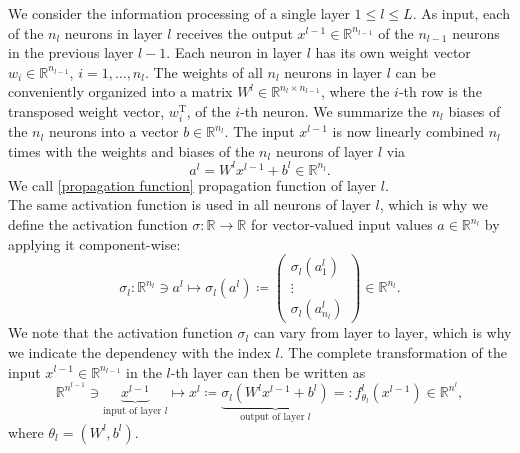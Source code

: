 We consider the information processing of a single layer $1 \leq l \leq L$. As input, each of the $n_l$ neurons in layer $l$ receives the output $x^{l-1} \in \mathbb{R}^{n_{l-1}}$ of the $n_{l-1}$ neurons in the previous layer $l-1$. Each neuron in layer $l$ has its own weight vector $w_i \in \mathbb{R}^{n_{l-1}}$, $i = 1, \ldots, n_l$. The weights of all $n_l$ neurons in layer $l$ can be conveniently organized into a matrix $W^l \in \mathbb{R}^{n_l \times n_{l-1}}$, where the $i$-th row is the transposed weight vector, $w^{\mathrm{T}}_i$, of the $i$-th neuron. We summarize the $n_l$ biases of the $n_l$ neurons into a vector $b \in \mathbb{R}^{n_l}$. The input $x^{l-1}$ is now linearly combined $n_l$ times with the weights and biases of the $n_l$ neurons of layer $l$ via 
\begin{equation}
    \label{propagation function}
    a^l = W^l x^{l-1} + b^l \in \mathbb{R}^{n_l}.
\end{equation}
We call \cref{propagation function} propagation function of layer $l$. \\
The same activation function is used in all neurons of layer $l$, which is why we define the activation function $\sigma \colon \mathbb{R} \to \mathbb{R}$ for vector-valued input values $a \in \mathbb{R}^{n_l}$ by applying it component-wise:
\begin{equation*}
    \sigma_l \colon \mathbb{R}^{n_l} \ni a^l \mapsto \sigma_l (a^l) \coloneqq \left(
        \begin{array}
            {c} \sigma_l \left( a^l_{1} \right) \\
            \vdots \\
            \sigma_l \left( a^l_{n_l} \right)
        \end{array}
        \right) \in \mathbb{R}^{n_l}.
\end{equation*}
We note that the activation function $\sigma_l$ can vary from layer to layer, which is why we indicate the dependency with the index $l$. The complete transformation of the input $x^{l-1} \in \mathbb{R}^{n_{l-1}}$ in the $l$-th layer can then be written as
\begin{equation}
    \label{action layer}
    \mathbb{R}^{n^{l-1}} \ni \underbrace{x^{l-1}}_{\text{input of layer } l} \mapsto x^{l}\coloneqq \underbrace{\sigma_{l}\left( W^{l} x^{l-1} + b^{l} \right)}_{\text{output of layer } l}=: f^{l}_{\theta_l} \left( x^{l-1} \right) \in \mathbb{R}^{n^{l}}, 
\end{equation}
where $\theta_l = (W^{l}, b^{l})$. \\

